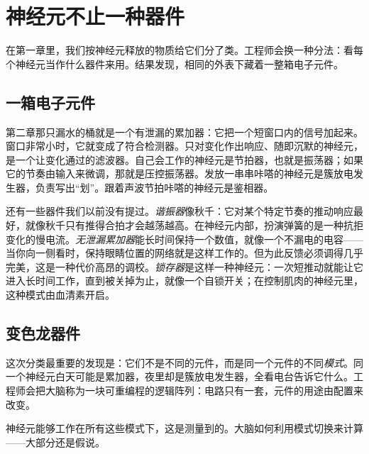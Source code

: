 \chapter{神经元不止一种器件}

在第一章里，我们按神经元释放的物质给它们分了类。工程师会换一种分法：看每个神经元当作什么器件来用。结果发现，相同的外表下藏着一整箱电子元件。

\section*{一箱电子元件}

第二章那只漏水的桶就是一个有泄漏的累加器：它把一个短窗口内的信号加起来。窗口非常小时，它就变成了符合检测器。只对变化作出响应、随即沉默的神经元，是一个让变化通过的滤波器。自己会工作的神经元是节拍器，也就是振荡器；如果它的节奏由输入来微调，那就是压控振荡器。发放一串串咔嗒的神经元是簇放电发生器，负责写出“划”。跟着声波节拍咔嗒的神经元是鉴相器。


还有一些器件我们以前没有提过。\emph{谐振器}像秋千：它对某个特定节奏的推动响应最好，就像秋千只有推得合拍才会越荡越高。在神经元内部，扮演弹簧的是一种抗拒变化的慢电流。\emph{无泄漏累加器}能长时间保持一个数值，就像一个不漏电的电容——当你向一侧看时，保持眼睛位置的网络就是这样工作的。但为此反馈必须调得几乎完美，这是一种代价高昂的调校。\emph{锁存器}是这样一种神经元：一次短推动就能让它进入长时间工作，直到被关掉为止，就像一个自锁开关；在控制肌肉的神经元里，这种模式由血清素开启。

\section*{变色龙器件}

这次分类最重要的发现是：它们不是不同的元件，而是同一个元件的不同\emph{模式}。同一个神经元白天可能是累加器，夜里却是簇放电发生器，全看电台告诉它什么。工程师会把大脑称为一块可重编程的逻辑阵列：电路只有一套，元件的用途由配置来改变。

神经元能够工作在所有这些模式下，这是测量到的。大脑如何利用模式切换来计算——大部分还是假说。

